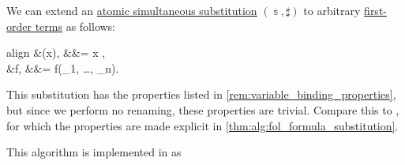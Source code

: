 \begin{algorithm}\label{alg:fol_term_substitution}\mimprovised
  We can extend an \hyperref[def:atomic_lambda_term_substitution]{atomic simultaneous substitution} \( (\Bbbs, \sharp) \) to arbitrary \hyperref[def:fol_term]{first-order terms} as follows:
  \begin{empheq}[left={\tau[\Bbbs]} \coloneqq \empheqlbrace]{align}
    &\Bbbs(x),                                                   &&\tau = x \in {},               \label{eq:alg:fol_term_substitution/var} \\
    &f, &&\tau = f(\sigma_1, \ldots, \sigma_n). \label{eq:alg:fol_term_substitution/fun}
  \end{empheq}
\end{algorithm}
\begin{comments}
  \item This substitution has the properties listed in \cref{rem:variable_binding_properties}, but since we perform no renaming, these properties are trivial. Compare this to , for which the properties are made explicit in \cref{thm:alg:fol_formula_substitution}.

  \item This algorithm is implemented in \cite{notebook:code} as
  \begin{CodeRefDisplay}
  \end{CodeRefDisplay}
\end{comments}

